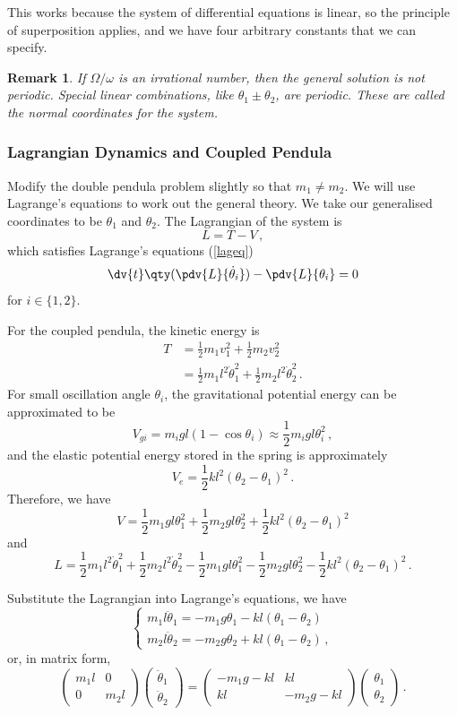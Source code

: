 \documentclass{article}
\theoremstyle{plain}\theoremheaderfont{\normalfont\itshape}\theorembodyfont{\rmfamily}\theoremseparator{.}\newtheorem*{rem}{Remark}\newtheorem*{ex}{Example}\newtheorem*{proof}{Proof}\newtheorem*{altp}{Alternative proof}
\theoremstyle{plain}\theoremheaderfont{\normalfont\bfseries}\theorembodyfont{\rmfamily}\theoremseparator{.}\newtheorem{thm}{Theorem}[section]\newtheorem{lem}[thm]{Lemma}\newtheorem{prop}[thm]{Proposition}\newtheorem*{cor}{Corollary}\newtheorem{defn}[thm]{Definition}\newtheorem{clm}[thm]{Claim}\newtheorem{clminproof}{Claim}
\theoremstyle{break}\theoremheaderfont{\normalfont\itshape}\theorembodyfont{\rmfamily}\theoremseparator{.\medskip}\newtheorem*{proofskip}{Proof}\newtheorem*{exs}{Examples}\newtheorem*{rems}{Remarks}
\theoremstyle{break}\theoremheaderfont{\normalfont\bfseries}\theorembodyfont{\rmfamily}\theoremseparator{.\medskip}\newtheorem{lemskip}[thm]{Lemma}\newtheorem{defnskip}[thm]{Definition}\newtheorem{propskip}[thm]{Proposition}\newtheorem{thmskip}[thm]{Theorem}
\numberwithin{equation}{section}
\begin{document}
	This works because the system of differential equations is linear, so the principle of superposition applies, and we have four arbitrary constants that we can specify.
	\begin{rem}
		If \(\Omega/\omega\) is an irrational number, then the general solution is not periodic. Special linear combinations, like \(\theta_1\pm\theta_2\), are periodic. These are called the \textit{normal coordinates} for the system.
	\end{rem}
	\subsubsection{Lagrangian Dynamics and Coupled Pendula}
	Modify the double pendula problem slightly so that \(m_1\ne m_2\). We will use Lagrange's equations to work out the general theory. We take our generalised coordinates to be \(\theta_1\) and \(\theta_2\). The Lagrangian of the system is
	\[L=T-V\,,\]
	which satisfies Lagrange's equations (\cref{lageq})
	\[\dv{t}\qty(\pdv{L}{\dot{\theta}_i})-\pdv{L}{\theta_i}=0\]
	for \(i\in\{1,2\}\).

	For the coupled pendula, the kinetic energy is
	\begin{align*}
		T&=\frac{1}{2}m_1v_1^2+\frac{1}{2}m_2v_2^2\\
		&=\frac{1}{2}m_1l^2\dot{\theta}_1^2+\frac{1}{2}m_2l^2\dot{\theta}_2^2\,.
	\end{align*}
	For small oscillation angle \(\theta_i\), the gravitational potential energy can be approximated to be
	\[V_{gi}=m_igl(1-\cos\theta_i)\approx\frac{1}{2}m_i gl\theta_i^2\,,\]
	and the elastic potential energy stored in the spring is approximately
	\[V_{e}=\frac{1}{2}kl^2(\theta_2-\theta_1)^2\,.\]
	Therefore, we have
	\[V=\frac{1}{2}m_1gl\theta_1^2+\frac{1}{2}m_2gl\theta_2^2+\frac{1}{2}kl^2(\theta_2-\theta_1)^2\]
	and
	\[L=\frac{1}{2}m_1l^2\dot{\theta}_1^2+\frac{1}{2}m_2l^2\dot{\theta}_2^2-\frac{1}{2}m_1gl\theta_1^2-\frac{1}{2}m_2gl\theta_2^2-\frac{1}{2}kl^2(\theta_2-\theta_1)^2\,.\]

	Substitute the Lagrangian into Lagrange's equations, we have
	\[\begin{cases}
		m_1l\ddot{\theta}_1=-m_1g\theta_1-kl(\theta_1-\theta_2)\\
		m_2l\ddot{\theta}_2=-m_2g\theta_2+kl(\theta_1-\theta_2)\,,
	\end{cases}\]
	or, in matrix form,
	\begin{equation}\tag{\(\dagger\)}
		\begin{pmatrix}
			m_1l & 0\\
			0 & m_2l
		\end{pmatrix}\begin{pmatrix}
			\ddot{\theta}_1 \\ \ddot{\theta}_2
		\end{pmatrix}=\begin{pmatrix}
			-m_1g-kl & kl \\
			kl & -m_2g-kl
		\end{pmatrix}\begin{pmatrix}
			\theta_1 \\ \theta_2
		\end{pmatrix}\,.
	\end{equation}
	
\end{document}
